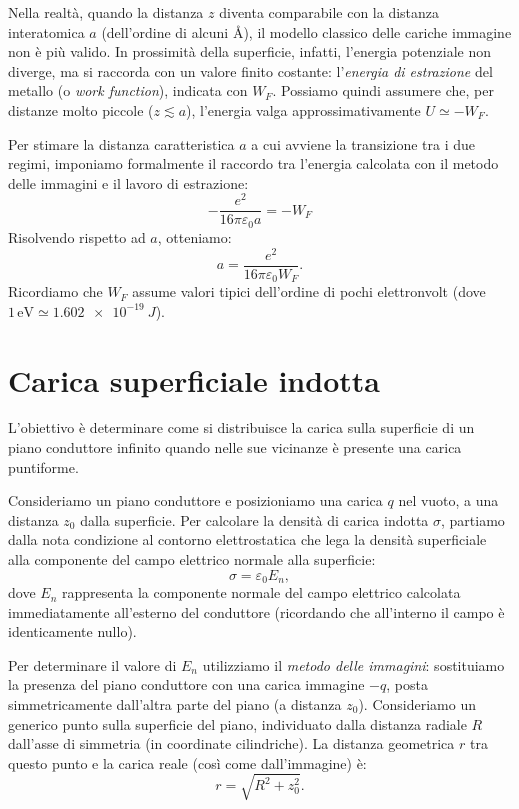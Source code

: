 \documentclass{book}
\begin{document}
Nella realtà, quando la distanza $z$ diventa comparabile con la distanza interatomica $a$ (dell'ordine di alcuni \AA), il modello classico delle cariche immagine non è più valido. In prossimità della superficie, infatti, l'energia potenziale non diverge, ma si raccorda con un valore finito costante: l'\emph{energia di estrazione} del metallo (o \emph{work function}), indicata con $W_F$.
Possiamo quindi assumere che, per distanze molto piccole ($z\lesssim a$), l'energia valga approssimativamente $U\simeq -W_F$.

Per stimare la distanza caratteristica $a$ a cui avviene la transizione tra i due regimi, imponiamo formalmente il raccordo tra l'energia calcolata con il metodo delle immagini e il lavoro di estrazione:
\[
-\frac{e^{2}}{16\pi\varepsilon_0 a} = -W_F
\]
Risolvendo rispetto ad $a$, otteniamo:
\[
a = \frac{e^{2}}{16\pi\varepsilon_0 W_F}.
\]
Ricordiamo che $W_F$ assume valori tipici dell'ordine di pochi elettronvolt (dove $1\,\text{eV} \simeq \SI{1.602e-19}{J}$).

\section{Carica superficiale indotta}

L'obiettivo è determinare come si distribuisce la carica sulla superficie di un piano conduttore infinito quando nelle sue vicinanze è presente una carica puntiforme.

Consideriamo un piano conduttore e posizioniamo una carica \(q\) nel vuoto, a una distanza \(z_0\) dalla superficie. Per calcolare la densità di carica indotta \(\sigma\), partiamo dalla nota condizione al contorno elettrostatica che lega la densità superficiale alla componente del campo elettrico normale alla superficie:
\[
\sigma=\varepsilon_0 E_n,
\]
dove \(E_n\) rappresenta la componente normale del campo elettrico calcolata immediatamente all'esterno del conduttore (ricordando che all'interno il campo è identicamente nullo).

\medskip

Per determinare il valore di \(E_n\) utilizziamo il \emph{metodo delle immagini}: sostituiamo la presenza del piano conduttore con una carica immagine \(-q\), posta simmetricamente dall'altra parte del piano (a distanza \(z_0\)).
Consideriamo un generico punto sulla superficie del piano, individuato dalla distanza radiale \(R\) dall'asse di simmetria (in coordinate cilindriche). La distanza geometrica \(r\) tra questo punto e la carica reale (così come dall'immagine) è:
\[
r=\sqrt{R^2+z_0^2}.
\]
\end{document}
